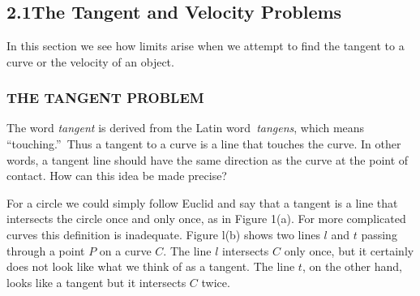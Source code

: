 \documentclass{sebase}
\begin{document}
\chapter[2\quad Limits and Derivatives]{}

\section{2.1\quad The Tangent and Velocity Problems}

\renewcommand{\ET}{1}%
\noCCC%
\renewcommand{\RM}{1}%
\renewcommand{\RM}{0}%
\setcounter{page}{2}%

In this section we see how limits arise when we attempt to find the tangent
to a curve or the velocity of an object.

\subsection{THE TANGENT PROBLEM}

The
word \textit{tangent} is derived from the Latin word\textit{\ tangens},
which means \textquotedblleft touching.\textquotedblright\ Thus a tangent to
a curve is a line that touches the curve. In other words, a tangent line
should have the same direction as the curve at the point of contact. How can
this idea be made precise?

For a circle we could simply follow Euclid and say that a tangent is a line
that intersects the circle once and only once, as in Figure 1(a). For more
complicated curves this definition is inadequate. Figure l(b) shows two
lines $l$ and $t$ passing through a point $P$ on a curve $C$. The line $l$
intersects $C$ only once, but it certainly does not look like what we think
of as a tangent. The line $t$, on the other hand, looks like a tangent but
it intersects $C$ twice.
\end{document}
